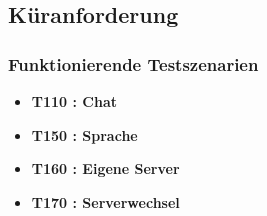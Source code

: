 \documentclass[parskip=full,11pt]{scrartcl}
\begin{document}
	\subsection{Küranforderung}
		\subsubsection{Funktionierende Testszenarien}
			\begin{itemize}
				\item \textbf{T110 : Chat} %
				\item \textbf{T150 : Sprache}
				\item \textbf{T160 : Eigene Server}
				\item \textbf{T170 : Serverwechsel}
	    \end{itemize}
\end{document}
